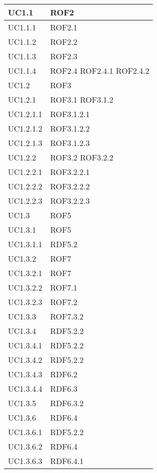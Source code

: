 \begin{center}
\begin{longtable}{| p{4cm} | p{4cm} |}
		UC1.1  &  ROF2 \\
		\hline
		UC1.1.1  &  ROF2.1 \\
		\hline
		UC1.1.2  &  ROF2.2 \\
		\hline
		UC1.1.3  &  ROF2.3 \\
		\hline
		UC1.1.4  &  ROF2.4 \newline ROF2.4.1 \newline ROF2.4.2\\
		\hline
		UC1.2  &  ROF3 \\
		\hline
		UC1.2.1  &  ROF3.1 \newline ROF3.1.2 \\
		\hline
		UC1.2.1.1  &  ROF3.1.2.1  \\
		\hline
		UC1.2.1.2  &  ROF3.1.2.2  \\
		\hline
		UC1.2.1.3  &  ROF3.1.2.3  \\
		\hline
		UC1.2.2  &  ROF3.2 \newline ROF3.2.2 \\
		\hline
		UC1.2.2.1  &  ROF3.2.2.1 \\
		\hline
		UC1.2.2.2  &  ROF3.2.2.2 \\
		\hline
		UC1.2.2.3  &  ROF3.2.2.3 \\
		\hline	
		UC1.3  &  ROF5 \\
		\hline
		UC1.3.1  &  ROF5 \\
		\hline
		UC1.3.1.1  &  RDF5.2 \\
		\hline
		UC1.3.2  &  ROF7 \\
		\hline
		UC1.3.2.1  &  ROF7 \\
		\hline
		UC1.3.2.2  &  ROF7.1 \\
		\hline
		UC1.3.2.3  &  ROF7.2 \\
		\hline
		UC1.3.3  &  ROF7.3.2 \\
		\hline
		UC1.3.4  &  RDF5.2.2 \\
		\hline
		UC1.3.4.1  &  RDF5.2.2 \\
		\hline
		UC1.3.4.2  &  RDF5.2.2 \\
		\hline
		UC1.3.4.3  &  RDF6.2 \\
		\hline
		UC1.3.4.4  &  RDF6.3 \\
		\hline
		UC1.3.5  &  RDF6.3.2 \\
		\hline
		UC1.3.6  &  RDF6.4 \\
		\hline
		UC1.3.6.1  &  RDF5.2.2 \\
		\hline
		UC1.3.6.2  &  RDF6.4 \\
		\hline
		UC1.3.6.3  &  RDF6.4.1 \\

\end{longtable}
\end{center}
